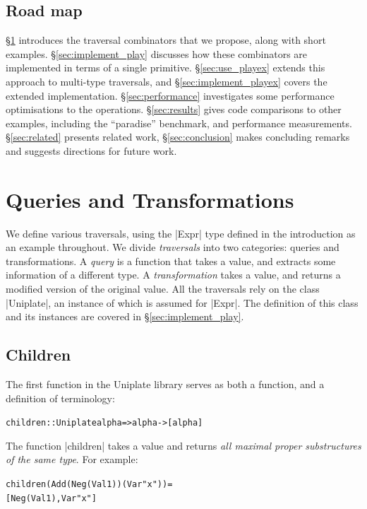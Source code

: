 \documentclass[preprint]{sigplanconf}
\newenvironment{code}{\begin{alltt}\small}{\end{alltt}}
\begin{document}
\subsection{Road map}

\S\ref{sec:use_play} introduces the traversal combinators that we propose, along with short examples. \S\ref{sec:implement_play} discusses how these combinators are implemented in terms of a single primitive. \S\ref{sec:use_playex} extends this approach to multi-type traversals, and \S\ref{sec:implement_playex} covers the extended implementation. \S\ref{sec:performance} investigates some performance optimisations to the operations. \S\ref{sec:results} gives code comparisons to other examples, including the ``paradise'' benchmark, and performance measurements. \S\ref{sec:related} presents related work, \S\ref{sec:conclusion} makes concluding remarks and suggests directions for future work.


\section{Queries and Transformations}
\label{sec:use_play}

We define various traversals, using the |Expr| type defined in the introduction as an example throughout. We divide \textit{traversals} into two categories: queries and transformations. A \textit{query} is a function that takes a value, and extracts some information of a different type. A \textit{transformation} takes a value, and returns a modified version of the original value. All the traversals rely on the class |Uniplate|, an instance of which is assumed for |Expr|. The definition of this class and its instances are covered in \S\ref{sec:implement_play}.

\subsection{Children}

The first function in the Uniplate library serves as both a function, and a definition of terminology:

\begin{code}
children :: Uniplate alpha => alpha -> [alpha]
\end{code}

The function |children| takes a value and returns \textit{all maximal proper substructures of the same type}. For example:

\begin{code}
children (Add (Neg (Val 1)) (Var "x")) =
    [Neg (Val 1), Var "x"]
\end{code}
\end{document}

